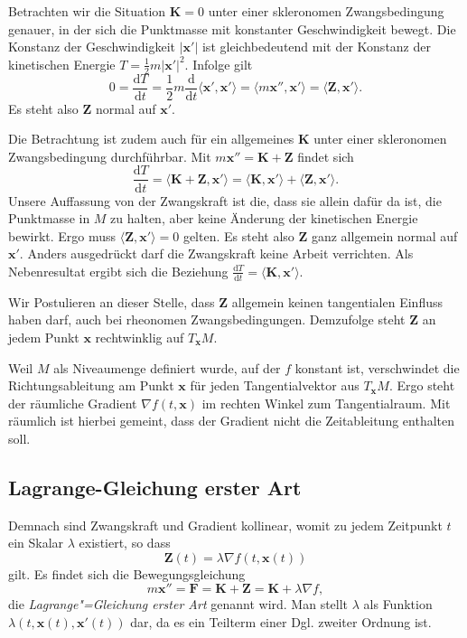 \documentclass[a4paper,10pt,fleqn,twocolumn,twoside,dvipdfmx]{scrartcl}
\numberwithin{equation}{section}
\newcommand{\bv}[1]{\mathbf{#1}}
\begin{document}
Betrachten wir die Situation $\bv K = 0$ unter einer skleronomen
Zwangsbedingung genauer, in der sich die
Punktmasse mit konstanter Geschwindigkeit bewegt. Die Konstanz
der Geschwindigkeit $|\bv x'|$ ist gleichbedeutend mit der Konstanz
der kinetischen Energie $T = \frac{1}{2}m|\bv x'|^2$. Infolge gilt
\[0=\frac{\mathrm dT}{\mathrm dt}
= \frac{1}{2}m\frac{\mathrm d}{\mathrm dt}\langle\bv x',\bv x'\rangle
= \langle m\bv x'',\bv x'\rangle = \langle\bv Z,\bv x'\rangle.\]
Es steht also $\bv Z$ normal auf $\bv x'$.

Die Betrachtung ist zudem auch für ein allgemeines $\bv K$
unter einer skleronomen Zwangsbedingung durchführbar.
Mit $m\bv x''=\bv K+\bv Z$ findet sich
\[\frac{\mathrm dT}{\mathrm dt} = \langle\bv K+\bv Z,\bv x'\rangle
= \langle\bv K,\bv x'\rangle + \langle\bv Z,\bv x'\rangle.\]
Unsere Auffassung von der Zwangskraft ist die, dass sie allein
dafür da ist, die Punktmasse in $M$ zu halten, aber keine
Änderung der kinetischen Energie bewirkt. Ergo muss
$\langle\bv Z,\bv x'\rangle = 0$ gelten. Es steht also $\bv Z$
ganz allgemein normal auf $\bv x'$. Anders ausgedrückt darf die
Zwangskraft keine Arbeit verrichten. Als Nebenresultat ergibt sich die
Beziehung
$\frac{\mathrm dT}{\mathrm dt} = \langle\bv K,\bv x'\rangle$.

Wir Postulieren an dieser Stelle, dass $\bv Z$ allgemein keinen
tangentialen Einfluss haben darf, auch bei rheonomen Zwangsbedingungen.
Demzufolge steht $\bv Z$ an jedem Punkt $\bv x$ rechtwinklig auf
$T_{\bv x} M$.

Weil $M$ als Niveaumenge definiert wurde, auf der $f$ konstant ist,
verschwindet die Richtungsableitung am Punkt $\bv x$ für jeden
Tangentialvektor aus $T_{\bv x} M$. Ergo steht der räumliche Gradient
$\nabla f(t,\bv x)$ im rechten Winkel zum Tangentialraum. Mit räumlich
ist hierbei gemeint, dass der Gradient nicht die Zeitableitung enthalten
soll.

\subsection{Lagrange-Gleichung erster Art}

Demnach sind Zwangskraft und Gradient kollinear, womit zu jedem
Zeitpunkt $t$ ein Skalar $\lambda$ existiert, so dass
\[\bv Z(t) = \lambda\nabla f(t,\bv x(t))\]
gilt. Es findet sich die Bewegungsgleichung
\[m\bv x'' = \bv F = \bv K+\bv Z = \bv K+\lambda\nabla f,\]
die \emph{Lagrange"=Gleichung erster Art} genannt wird. Man stellt
$\lambda$ als Funktion $\lambda(t,\bv x(t),\bv x'(t))$ dar, da es
ein Teilterm einer Dgl. zweiter Ordnung ist.
\end{document}
